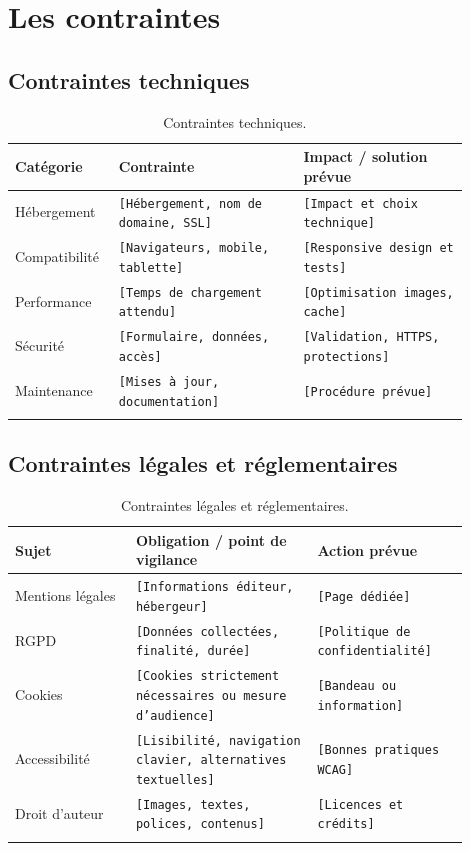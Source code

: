 \documentclass[11pt,a4paper]{report}
\newcommand{\placeholder}[1]{\textcolor{placeholderColor}{\texttt{[#1]}}}
\begin{document}
\chapter{Les contraintes}

\section{Contraintes techniques}
\begin{longtable}{p{0.18\linewidth}p{0.38\linewidth}p{0.34\linewidth}}
\toprule
\textbf{Catégorie} & \textbf{Contrainte} & \textbf{Impact / solution prévue} \\
\midrule
\endhead
Hébergement & \placeholder{Hébergement, nom de domaine, SSL} & \placeholder{Impact et choix technique} \\
Compatibilité & \placeholder{Navigateurs, mobile, tablette} & \placeholder{Responsive design et tests} \\
Performance & \placeholder{Temps de chargement attendu} & \placeholder{Optimisation images, cache} \\
Sécurité & \placeholder{Formulaire, données, accès} & \placeholder{Validation, HTTPS, protections} \\
Maintenance & \placeholder{Mises à jour, documentation} & \placeholder{Procédure prévue} \\
\bottomrule
\caption{Contraintes techniques.}
\label{tab:contraintes-techniques}
\end{longtable}

\section{Contraintes légales et réglementaires}
\begin{longtable}{p{0.24\linewidth}p{0.36\linewidth}p{0.30\linewidth}}
\toprule
\textbf{Sujet} & \textbf{Obligation / point de vigilance} & \textbf{Action prévue} \\
\midrule
\endhead
Mentions légales & \placeholder{Informations éditeur, hébergeur} & \placeholder{Page dédiée} \\
RGPD & \placeholder{Données collectées, finalité, durée} & \placeholder{Politique de confidentialité} \\
Cookies & \placeholder{Cookies strictement nécessaires ou mesure d'audience} & \placeholder{Bandeau ou information} \\
Accessibilité & \placeholder{Lisibilité, navigation clavier, alternatives textuelles} & \placeholder{Bonnes pratiques WCAG} \\
Droit d'auteur & \placeholder{Images, textes, polices, contenus} & \placeholder{Licences et crédits} \\
\bottomrule
\caption{Contraintes légales et réglementaires.}
\label{tab:contraintes-legales}
\end{longtable}
\end{document}
